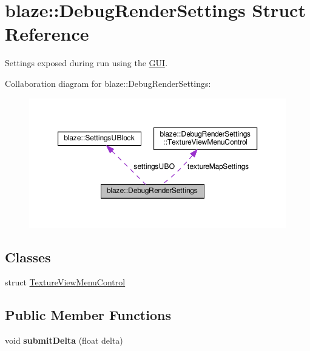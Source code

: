 \hypertarget{structblaze_1_1DebugRenderSettings}{}\section{blaze\+:\+:Debug\+Render\+Settings Struct Reference}
\label{structblaze_1_1DebugRenderSettings}


Settings exposed during run using the \hyperlink{classblaze_1_1GUI}{G\+UI}.  




Collaboration diagram for blaze\+:\+:Debug\+Render\+Settings\+:\nopagebreak
\begin{figure}[H]
\begin{center}
\leavevmode
\includegraphics[width=350pt]{structblaze_1_1DebugRenderSettings__coll__graph}
\end{center}
\end{figure}
\subsection*{Classes}
\begin{DoxyCompactItemize}
\item 
struct \hyperlink{structblaze_1_1DebugRenderSettings_1_1TextureViewMenuControl}{Texture\+View\+Menu\+Control}
\end{DoxyCompactItemize}
\subsection*{Public Member Functions}
\begin{DoxyCompactItemize}
\item 
\mbox{\label{structblaze_1_1DebugRenderSettings_aa8d60e20bb4e57f31f0cfc6f43d6aa95}} 
void {\bfseries submit\+Delta} (float delta)
\end{DoxyCompactItemize}

